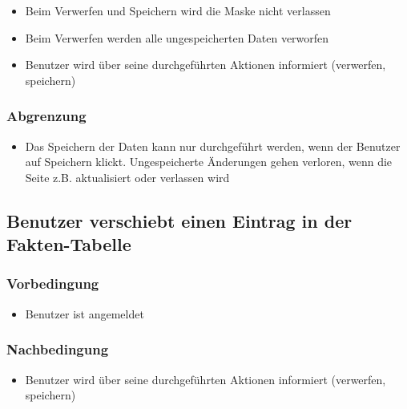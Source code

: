 \documentclass[a4paper,12pt]{article}
\begin{document}
\begin{itemize}

\item
  Beim Verwerfen und Speichern wird die Maske nicht verlassen
\item
  Beim Verwerfen werden alle ungespeicherten Daten verworfen
\item
  Benutzer wird über seine durchgeführten Aktionen informiert
  (verwerfen, speichern)
\end{itemize}

\subsubsection{Abgrenzung}\label{abgrenzung-8}

\begin{itemize}

\item
  Das Speichern der Daten kann nur durchgeführt werden, wenn der
  Benutzer auf Speichern klickt. Ungespeicherte Änderungen gehen
  verloren, wenn die Seite z.B. aktualisiert oder verlassen wird
\end{itemize}

\subsection{Benutzer verschiebt einen Eintrag in der Fakten-Tabelle}\label{benutzer-verschiebt-einen-eintrag-in-der-fakten-tabelle}

\subsubsection{Vorbedingung}\label{vorbedingung-9}

\begin{itemize}

\item
  Benutzer ist angemeldet
\end{itemize}

\subsubsection{Nachbedingung}\label{nachbedingung-9}

\begin{itemize}

\item
  Benutzer wird über seine durchgeführten Aktionen informiert
  (verwerfen, speichern)
\end{itemize}
\end{document}
